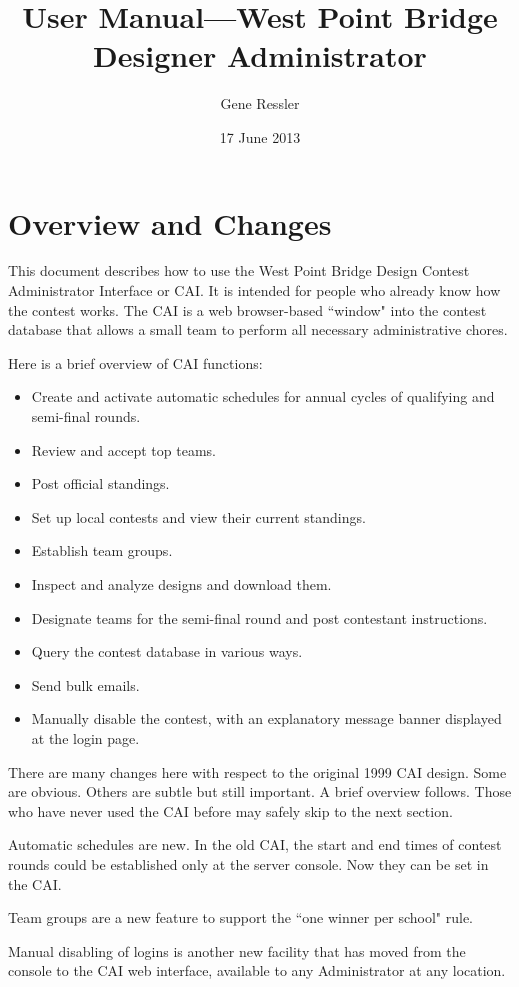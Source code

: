 \documentclass[11pt,letterpaper]{refart}
\title{User Manual---West Point Bridge Designer Administrator}
\author{Gene Ressler}
\date{17 June 2013}
\begin{document}
\maketitle
\tableofcontents\newpage

\section{Overview and Changes}
This document describes how to use the West Point Bridge Design Contest Administrator
Interface or CAI. It is intended for people who already know how the contest works. The CAI 
is a web browser-based ``window" into the contest database that allows a small team
to perform all necessary administrative chores. 

Here is a brief overview of CAI functions:
\begin{itemize}
\item Create and activate automatic schedules for annual cycles of qualifying and semi-final rounds.
\item Review and accept top teams.
\item Post official standings.
\item Set up local contests and view their current standings.
\item Establish team groups.
\item Inspect and analyze designs and download them.
\item Designate teams for the semi-final round and post contestant instructions.
\item Query the contest database in various ways.
\item Send bulk emails.
\item Manually disable the contest, with an explanatory message banner displayed at
 the login page.
\end{itemize}
There are many changes here with respect to the original 1999 CAI design. Some are
obvious.  Others are subtle but still important. A brief overview follows.  Those who
have never used the CAI before may safely skip to the next section.

Automatic schedules are new.  In the old CAI, the start and end times of contest 
rounds could be established only at the server console. Now they can be 
set in the CAI. 

Team groups are a new feature to support the 
``one winner per school" rule. 

Manual disabling of logins is another new facility that
has moved from the console to the CAI web interface, available to any Administrator
at any location.
\end{document}

